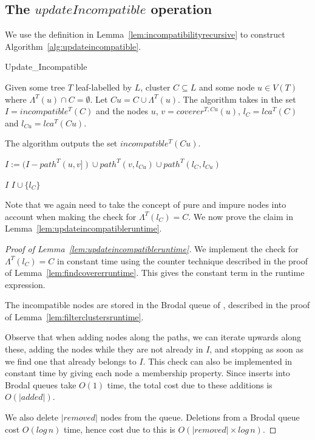 \documentclass[12pt,a4paper]{article}
\newcommand{\leafset}{\Lambda}
\begin{document}
    \subsection{The $updateIncompatible$ operation}
    \label{subsec:updateincompatible}

    We use the definition in Lemma~\ref{lem:incompatibilityrecursive} to construct Algorithm~\ref{alg:updateincompatible}.

    \begin{algorithm}
        \caption{Update\_Incompatible}
        \label{alg:updateincompatible}

        \begin{algorithmic}[1]
            \Input Given some tree $T$ leaf-labelled by $L$, cluster $C \subseteq L$ and some node $u \in V(T)$ where $\leafset^{T}(u) \cap C = \emptyset$. Let $Cu = C \cup \leafset^{T}(u)$. The algorithm takes in the set $I = incompatible^{T}(C)$ and the nodes $u$, $v = coverer^{T, Cu}(u)$, $l_C = lca^{T}(C)$ and $l_{Cu} = lca^{T}(Cu)$.

            \Output The algorithm outputs the set $incompatible^{T}(Cu)$.

            \State $I := (I - path^{T}(u, v]) \cup path^{T}(v, l_{Cu}) \cup path^{T}(l_C, l_{Cu})$

            \If{($\leafset^{T}(l_C) = C$ and $l_C$ is pure) or $l_C = l_{Cu}$}
                \State \Return $I$
            \Else
                \State \Return $I \cup \{l_C\}$
            \EndIf
        \end{algorithmic}
    \end{algorithm}

    Note that we again need to take the concept of pure and impure nodes into account when making the check for $\leafset^{T}(l_C) = C$. We now prove the claim in Lemma~\ref{lem:updateincompatibleruntime}.

    \begin{proof}[Proof of Lemma~\ref{lem:updateincompatibleruntime}]
        We implement the check for $\leafset^{T}(l_C) = C$ in constant time using the counter technique described in the proof of Lemma~\ref{lem:findcovererruntime}. This gives the constant term in the runtime expression.

        The incompatible nodes are stored in the Brodal queue of \cite{brodal1995fast}, described in the proof of Lemma~\ref{lem:filterclustersruntime}.

        Observe that when adding nodes along the paths, we can iterate upwards along these, adding the nodes while they are not already in $I$, and stopping as soon as we find one that already belongs to $I$. This check can also be implemented in constant time by giving each node a membership property. Since inserts into Brodal queues take $O(1)$ time, the total cost due to these additions is $O(|added|)$.

        We also delete $|removed|$ nodes from the queue. Deletions from a Brodal queue cost $O(log\,n)$ time, hence cost due to this is $O(|removed| \times log\,n)$.
    \end{proof}
\end{document}
